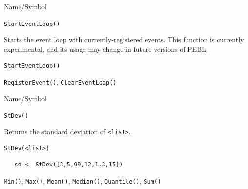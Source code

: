 \begin{desc}{Name/Symbol}
\item[Name/Symbol]  	\verb+StartEventLoop()+ 

\item[Description]  Starts the event loop with currently-registered events.  This function is currently experimental, and its usage may change in future versions of PEBL.

\item[Usage]       	
\begin{verbatim}
StartEventLoop()        
\end{verbatim}

\item[Example]	

\item[See Also] 
\verb+RegisterEvent()+, \verb+ClearEventLoop()+
\end{desc}





\begin{desc}{Name/Symbol}
\item[Name/Symbol]  	\verb+StDev()+ 

\item[Description]  Returns the standard deviation of \verb+<list>+.

\item[Usage]       	
\begin{verbatim}
StDev(<list>)        
\end{verbatim}

\item[Example]	
\begin{verbatim}
   sd <- StDev([3,5,99,12,1.3,15])        
\end{verbatim}

\item[See Also]     	\verb+Min()+, \verb+Max()+, \verb+Mean()+, \verb+Median()+, \verb+Quantile()+, \verb+Sum()+
\end{desc}






